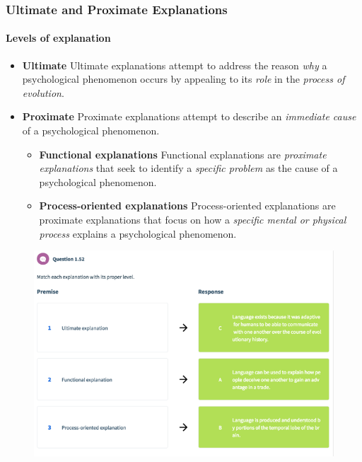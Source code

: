 \documentclass{article}
\begin{document}
 	\subsubsection{Ultimate and Proximate Explanations}
 	\paragraph{Levels of explanation}
 	\begin{itemize}
 		\item \textbf{Ultimate}
 			\newline Ultimate explanations attempt to address the reason \emph{why} a psychological phenomenon occurs by appealing to its \emph{role} in the \emph{process of evolution}.
 		\item \textbf{Proximate}
 			\newline Proximate explanations attempt to describe an \emph{immediate cause} of a psychological phenomenon.
 			\begin{itemize}
 				\item \textbf{Functional explanations}
 					\newline Functional explanations are \emph{proximate explanations} that seek to identify a \emph{specific problem} as the cause of a psychological phenomenon.
 				\item \textbf{Process-oriented explanations}
 					\newline Process-oriented explanations are proximate explanations that focus on how a \emph{specific mental or physical process} explains a psychological phenomenon.
 			\end{itemize}
 	\end{itemize}
 	\begin{figure}[H]
 		\centering
 		\includegraphics{psy100/0152}	
 	\end{figure}
\end{document}
